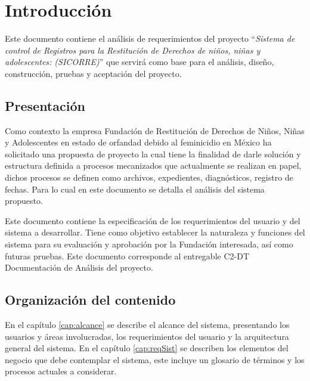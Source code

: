 
\chapter{Introducción}



Este documento contiene el análisis de requerimientos del proyecto ``{\em Sistema de control de Registros para la Restitución de Derechos de niños, niñas y adolescentes: (SICORRE)}'' que servirá como base para el análisis, diseño, construcción, pruebas y aceptación del proyecto.

\section{Presentación}

Como contexto la empresa Fundación de Restitución de Derechos de Niños, Niñas y Adolescentes en estado de orfandad debido al feminicidio en México ha solicitado una propuesta de proyecto la cual tiene la finalidad de darle solución y estructura definida a procesos mecanizados que actualmente se realizan en papel, dichos procesos se definen como archivos, expedientes, diagnósticos, registro de fechas. Para lo cual en este documento se detalla el análisis del sistema propuesto. 

Este documento contiene la especificación de los requerimientos del usuario y del sistema a desarrollar. Tiene como 
objetivo establecer la naturaleza y funciones del sistema para su evaluación y aprobación por la Fundación interesada, así como futuras pruebas.
Este documento corresponde al entregable C2-DT Documentación de Análisis del proyecto.

\section{Organización del contenido}

En el capítulo \ref{cap:alcance} se describe el alcance del sistema, presentando los usuarios y áreas involucradas, los requerimientos del usuario y la arquitectura general del sistema.
En el capítulo \ref{cap:reqSist} se describen los elementos del negocio que debe contemplar el sistema, este incluye un glosario de términos y los procesos actuales a considerar.

